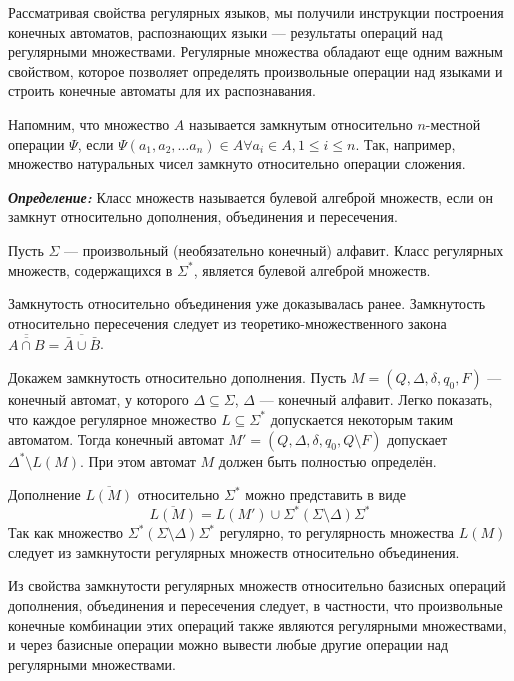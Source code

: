 Рассматривая свойства регулярных языков, мы получили инструкции построения конечных автоматов, распознающих языки --- результаты операций над регулярными множествами. Регулярные множества обладают еще одним важным свойством, которое позволяет определять произвольные операции над языками и строить конечные автоматы для их распознавания.

Напомним, что множество $A$ называется замкнутым относительно $n$-местной операции $\Psi$, если $\Psi(a_1, a_2, \ldots a_n) \in A \forall a_i \in A, 1 \leq i \leq n $. Так, например, множество натуральных чисел замкнуто относительно операции сложения. 

\textbf{\textit{Определение:}} Класс множеств называется булевой алгеброй множеств, если он замкнут относительно дополнения, объединения и пересечения.

\begin{mytheorem}
Пусть $\Sigma$ --- произвольный (необязательно конечный) алфавит. Класс регулярных множеств, содержащихся в $\Sigma^*$, является булевой алгеброй множеств.
\end{mytheorem}
\begin{myproof}
Замкнутость относительно объединения уже доказывалась ранее. Замкнутость относительно пересечения следует из теоретико-множественного закона $\overline{\overline{ A \cap B }} = \overline {\bar A \cup \bar B}$.

Докажем замкнутость относительно дополнения. Пусть $M = (Q, \Delta, \delta, q_0, F)$ --- конечный автомат, у которого $\Delta \subseteq \Sigma$, $\Delta$ --- конечный алфавит. Легко показать, что каждое регулярное множество $L \subseteq \Sigma^* $ допускается некоторым таким автоматом. Тогда конечный автомат $M' = (Q, \Delta, \delta, q_0, Q \setminus F)$ допускает $\Delta^* \setminus L(M)$. При этом автомат $M$ должен быть полностью определён. 

Дополнение $\overline {L(M)}$ относительно $\Sigma^*$ можно представить в виде 
\[
\overline {L(M)} = L(M') \cup \Sigma^*(\Sigma \setminus \Delta)\Sigma^*
\]
Так как множество $\Sigma^*(\Sigma \setminus \Delta)\Sigma^*$ регулярно, то регулярность множества $L(M)$ следует из замкнутости регулярных множеств относительно объединения.
\end{myproof}

Из свойства замкнутости регулярных множеств относительно базисных операций дополнения, объединения и пересечения следует, в частности, что произвольные конечные комбинации этих операций также являются регулярными множествами, и через базисные операции можно вывести любые другие операции над регулярными множествами.

